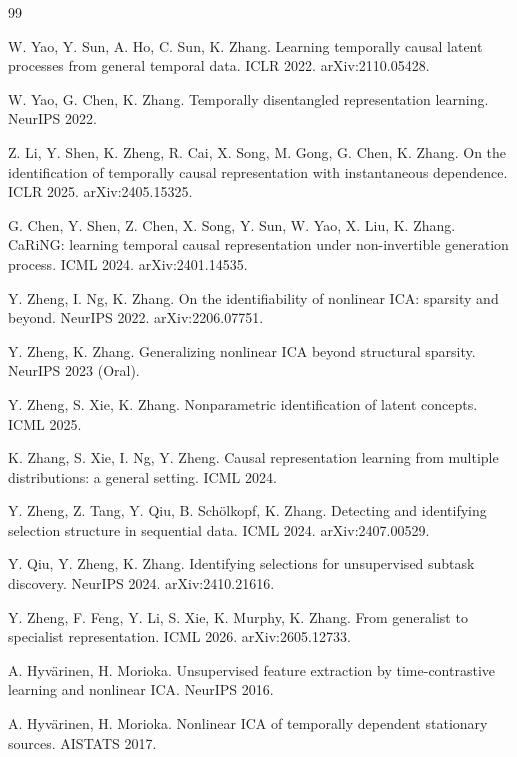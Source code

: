\documentclass[11pt]{article}
\theoremstyle{plain}
\theoremstyle{definition}
\begin{document}
\begin{thebibliography}{99}\footnotesize

 W. Yao, Y. Sun, A. Ho, C. Sun, K. Zhang. Learning temporally causal latent processes from general temporal data. ICLR 2022. arXiv:2110.05428.

 W. Yao, G. Chen, K. Zhang. Temporally disentangled representation learning. NeurIPS 2022.

 Z. Li, Y. Shen, K. Zheng, R. Cai, X. Song, M. Gong, G. Chen, K. Zhang. On the identification of temporally causal representation with instantaneous dependence. ICLR 2025. arXiv:2405.15325.

 G. Chen, Y. Shen, Z. Chen, X. Song, Y. Sun, W. Yao, X. Liu, K. Zhang. CaRiNG: learning temporal causal representation under non-invertible generation process. ICML 2024. arXiv:2401.14535.

 Y. Zheng, I. Ng, K. Zhang. On the identifiability of nonlinear ICA: sparsity and beyond. NeurIPS 2022. arXiv:2206.07751.

 Y. Zheng, K. Zhang. Generalizing nonlinear ICA beyond structural sparsity. NeurIPS 2023 (Oral).

 Y. Zheng, S. Xie, K. Zhang. Nonparametric identification of latent concepts. ICML 2025.

 K. Zhang, S. Xie, I. Ng, Y. Zheng. Causal representation learning from multiple distributions: a general setting. ICML 2024.

 Y. Zheng, Z. Tang, Y. Qiu, B. Sch\"olkopf, K. Zhang. Detecting and identifying selection structure in sequential data. ICML 2024. arXiv:2407.00529.

 Y. Qiu, Y. Zheng, K. Zhang. Identifying selections for unsupervised subtask discovery. NeurIPS 2024. arXiv:2410.21616.

 Y. Zheng, F. Feng, Y. Li, S. Xie, K. Murphy, K. Zhang. From generalist to specialist representation. ICML 2026. arXiv:2605.12733.

 A. Hyv\"arinen, H. Morioka. Unsupervised feature extraction by time-contrastive learning and nonlinear ICA. NeurIPS 2016.

 A. Hyv\"arinen, H. Morioka. Nonlinear ICA of temporally dependent stationary sources. AISTATS 2017.


\end{thebibliography}
\end{document}
